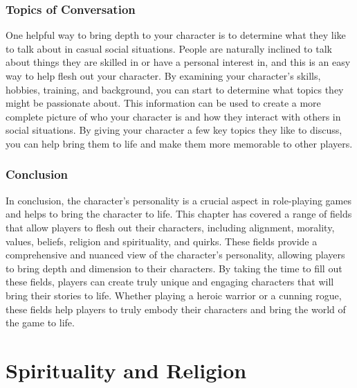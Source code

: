 \documentclass[12pt]{book}
\begin{document}
\subsection{\textbf{Topics of Conversation}}

One helpful way to bring depth to your character is to determine what they like to talk about in casual social situations. People are naturally inclined to talk about things they are skilled in or have a personal interest in, and this is an easy way to help flesh out your character. By examining your character's skills, hobbies, training, and background, you can start to determine what topics they might be passionate about. This information can be used to create a more complete picture of who your character is and how they interact with others in social situations. By giving your character a few key topics they like to discuss, you can help bring them to life and make them more memorable to other players.

\subsection{\textbf{Conclusion}}

In conclusion, the character's personality is a crucial aspect in role-playing games and helps to bring the character to life. This chapter has covered a range of fields that allow players to flesh out their characters, including alignment, morality, values, beliefs, religion and spirituality, and quirks. These fields provide a comprehensive and nuanced view of the character's personality, allowing players to bring depth and dimension to their characters. By taking the time to fill out these fields, players can create truly unique and engaging characters that will bring their stories to life. Whether playing a heroic warrior or a cunning rogue, these fields help players to truly embody their characters and bring the world of the game to life.


\chapter{Spirituality and Religion}
\end{document}
